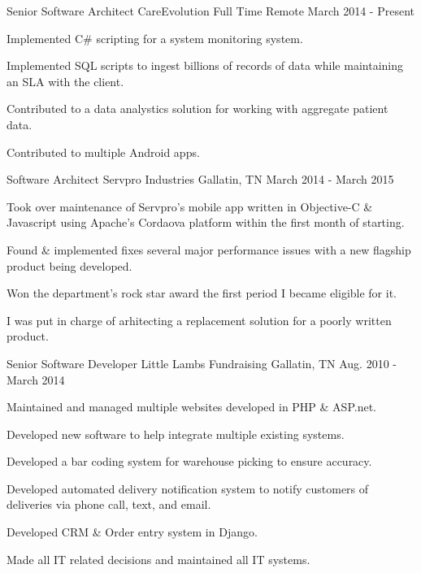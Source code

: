 \begin{cventries}
  \cventry
    {Senior Software Architect}
    {CareEvolution}
    {Full Time Remote}
    {March 2014 - Present}
    {
      \begin{cvitems}
        \item {Implemented C\# scripting for a system monitoring system.}
        \item {Implemented SQL scripts to ingest billions of records of data while maintaining an SLA with the client.}
        \item {Contributed to a data analystics solution for working with aggregate patient data.}
        \item {Contributed to multiple Android apps.}
      \end{cvitems}
    }
  \cventry
    {Software Architect}
    {Servpro Industries}
    {Gallatin, TN}
    {March 2014 - March 2015}
    {
      \begin{cvitems}
        \item {Took over maintenance of Servpro's mobile app written in Objective-C \& Javascript using Apache's Cordaova platform within the first month of starting.}
        \item {Found \& implemented fixes several major performance issues with a new flagship product being developed.}
        \item {Won the department's rock star award the first period I became eligible for it.}
        \item {I was put in charge of arhitecting a replacement solution for a poorly written product.}
      \end{cvitems}
    }
  \cventry
    {Senior Software Developer}
    {Little Lambs Fundraising}
    {Gallatin, TN}
    {Aug. 2010 - March 2014}
    {
      \begin{cvitems}
        \item {Maintained and managed multiple websites developed in PHP \& ASP.net.}
        \item {Developed new software to help integrate multiple existing systems.}
        \item {Developed a bar coding system for warehouse picking to ensure accuracy.}
        \item {Developed automated delivery notification system to notify customers of deliveries via phone call, text, and email.}
        \item {Developed CRM \& Order entry system in Django.}
        \item {Made all IT related decisions and maintained all IT systems.}

\end{cvitems}}
\end{cventries}
